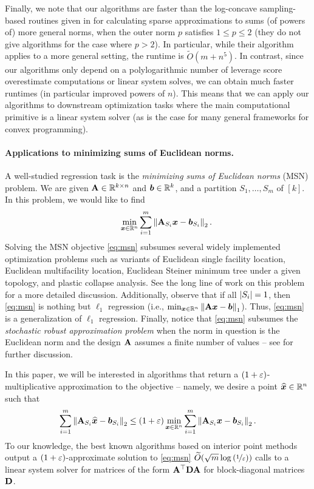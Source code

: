 \documentclass[11pt]{article}
\numberwithin{equation}{section}
\begin{document}
Finally, we note that our algorithms are faster than the log-concave sampling-based routines given in \cite{jlls23} for calculating sparse approximations to sums (of powers of) more general norms, when the outer norm $p$ satisfies $1 \le p \le 2$ (they do not give algorithms for the case where $p > 2$). In particular, while their algorithm applies to a more general setting, the runtime is $\widetilde{O}(m + n^5)$. In contrast, since our algorithms only depend on a polylogarithmic number of leverage score overestimate computations or linear system solves, we can obtain much faster runtimes (in particular improved powers of $n$). This means that we can apply our algorithms to downstream optimization tasks where the main computational primitive is a linear system solver (as is the case for many general frameworks for convex programming).

\paragraph{Applications to minimizing sums of Euclidean norms.} A well-studied regression task is the \textit{minimizing sums of Euclidean norms} (MSN) problem. We are given \(\mathbf{A} \in \mathbb{R}^{k \times n}\) and \(\bm{b} \in \mathbb{R}^k\), and a partition \(S_1, \ldots, S_m\) of \([k]\).
In this problem, we would like to find
\begin{align}
    \quad\quad\min_{\bm{x}\in\mathbb{R}^n} \sum_{i=1}^m \left\lVert \mathbf{A}_{S_i} \bm{x}-\bm{b}_{S_i} \right\rVert_2. \label{eq:msn}
\end{align}
Solving the MSN objective \eqref{eq:msn} subsumes several widely implemented optimization problems such as variants of Euclidean single facility location, Euclidean multifacility location, Euclidean Steiner minimum tree under a given topology, and plastic collapse analysis. See the long line of work on this problem \cite{and96,xy97,acco00,qsz02} for a more detailed discussion. Additionally, observe that if all $\left\lvert S_i \right\rvert=1$, then \eqref{eq:msn} is nothing but $\ell_1$ regression (i.e., $\min_{\bm{x}\in\mathbb{R}^n} \left\lVert \mathbf{A}\bm{x}-\bm{b} \right\rVert_1$). Thus, \eqref{eq:msn} is a generalization of $\ell_1$ regression. Finally, notice that \eqref{eq:msn} subsumes the \textit{stochastic robust approximation problem} when the norm in question is the Euclidean norm and the design $\mathbf{A}$ assumes a finite number of values -- see \cite[Section 6.4.1]{boyd2004convex} for further discussion.

In this paper, we will be interested in algorithms that return a $(1+\varepsilon)$-multiplicative approximation to the objective -- namely, we desire a point $\widehat{\bm{x}} \in \mathbb{R}^n$ such that
\begin{align*}
    \sum_{i=1}^m \left\lVert \mathbf{A}_{S_i}\widehat{\bm{x}}-\bm{b}_{S_i} \right\rVert_2 \le (1+\varepsilon)\min_{\bm{x}\in\mathbb{R}^n} \sum_{i=1}^m \left\lVert \mathbf{A}_{S_i} \bm{x}-\bm{b}_{S_i} \right\rVert_2.
\end{align*}
To our knowledge, the best known algorithms based on interior point methods output a $(1+\varepsilon)$-approximate solution to \eqref{eq:msn} $\widetilde{O}(\sqrt{m}\log\left(\nicefrac{1}{\varepsilon}\right))$ calls to a linear system solver \cite{and96,xy97} for matrices of the form $\mathbf{A}^{\top}\mathbf{D}\mathbf{A}$ for block-diagonal matrices $\mathbf{D}$.
\end{document}
